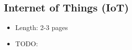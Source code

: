 \subsection{Internet of Things (IoT)}


\begin{itemize}
  \item Length: 2-3 pages
  \item TODO:
\end{itemize}
